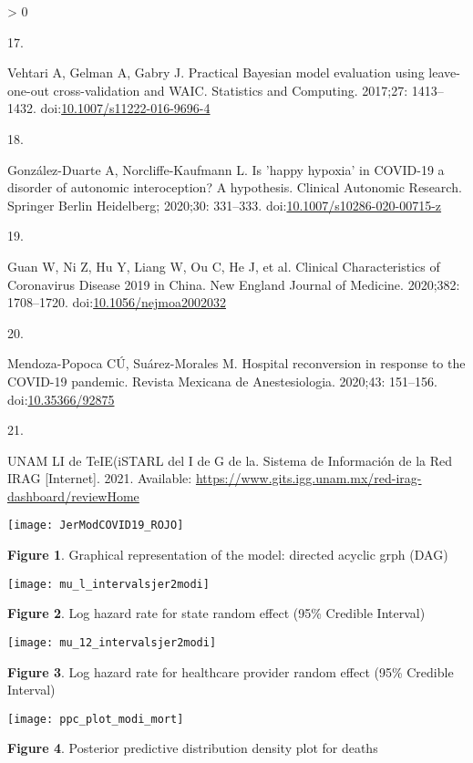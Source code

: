 \documentclass[10pt,letterpaper]{article}
\newlength{\csllabelwidth}
\newlength{\cslhangindent}
\newenvironment{CSLReferences}[2] %
 {%
  \setlength{\parindent}{0pt}
  \ifodd #1 \everypar{\setlength{\hangindent}{\cslhangindent}}\ignorespaces\fi
  \ifnum #2 > 0
  \setlength{\parskip}{#2\baselineskip}
  \fi
 }%
 {}
\newcommand{\CSLLeftMargin}[1]{\parbox[t]{\csllabelwidth}{#1}}
\newcommand{\CSLRightInline}[1]{\parbox[t]{\linewidth - \csllabelwidth}{#1}\break}
\begin{document}
\begin{CSLReferences}{0}{0}
\leavevmode\hypertarget{ref-Vehtari2017}{}%
\CSLLeftMargin{17. }
\CSLRightInline{Vehtari A, Gelman A, Gabry J. {Practical Bayesian model
evaluation using leave-one-out cross-validation and WAIC}. Statistics
and Computing. 2017;27: 1413--1432.
doi:\href{https://doi.org/10.1007/s11222-016-9696-4}{10.1007/s11222-016-9696-4}}

\leavevmode\hypertarget{ref-Gonzalez-Duarte2020}{}%
\CSLLeftMargin{18. }
\CSLRightInline{González-Duarte A, Norcliffe-Kaufmann L. {Is 'happy
hypoxia' in COVID-19 a disorder of autonomic interoception? A
hypothesis}. Clinical Autonomic Research. Springer Berlin Heidelberg;
2020;30: 331--333.
doi:\href{https://doi.org/10.1007/s10286-020-00715-z}{10.1007/s10286-020-00715-z}}

\leavevmode\hypertarget{ref-Guan2020}{}%
\CSLLeftMargin{19. }
\CSLRightInline{Guan W, Ni Z, Hu Y, Liang W, Ou C, He J, et al.
{Clinical Characteristics of Coronavirus Disease 2019 in China}. New
England Journal of Medicine. 2020;382: 1708--1720.
doi:\href{https://doi.org/10.1056/nejmoa2002032}{10.1056/nejmoa2002032}}

\leavevmode\hypertarget{ref-Mendoza-Popoca2020}{}%
\CSLLeftMargin{20. }
\CSLRightInline{Mendoza-Popoca CÚ, Suárez-Morales M. {Hospital
reconversion in response to the COVID-19 pandemic}. Revista Mexicana de
Anestesiologia. 2020;43: 151--156.
doi:\href{https://doi.org/10.35366/92875}{10.35366/92875}}

\leavevmode\hypertarget{ref-UNAM2021}{}%
\CSLLeftMargin{21. }
\CSLRightInline{UNAM LI de TeIE(iSTARL del I de G de la. {Sistema de
Informaci{ó}n de la Red IRAG} {[}Internet{]}. 2021. Available:
\url{https://www.gits.igg.unam.mx/red-irag-dashboard/reviewHome}}

\end{CSLReferences}

\newpage

\begin{center}\texttt{[image: JerModCOVID19\_ROJO]} \end{center}

\textbf{Figure 1}. Graphical representation of the model: directed
acyclic grph (DAG)

\begin{center}\texttt{[image: mu\_l\_intervalsjer2modi]} \end{center}

\textbf{Figure 2}. Log hazard rate for state random effect (95\%
Credible Interval)

\begin{center}\texttt{[image: mu\_12\_intervalsjer2modi]} \end{center}

\textbf{Figure 3}. Log hazard rate for healthcare provider random effect
(95\% Credible Interval)

\begin{center}\texttt{[image: ppc\_plot\_modi\_mort]} \end{center}

\textbf{Figure 4}. Posterior predictive distribution density plot for
deaths

\nolinenumbers
\end{document}
